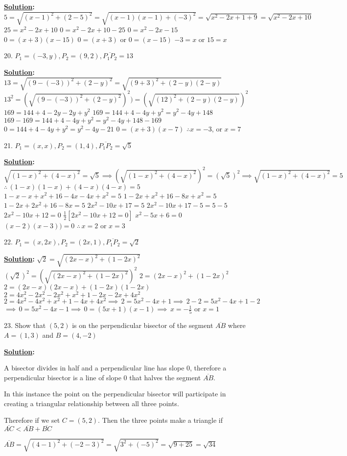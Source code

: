 \documentclass[10pt,letterpaper]{article}
\begin{document}
\textbf{\underline {Solution}:}
$5=\sqrt{(x-1)^2+(2-5)^2}=\sqrt{(x-1)(x-1)+(-3)^2}=\sqrt{x^2-2x+1+9}=\sqrt{x^2-2x+10}$
$25=x^2-2x+10$
$0=x^2-2x+10-25$
$0=x^2-2x-15$
$0=(x+3)(x-15)$
$0=(x+3)$ or $0=(x-15)$
$-3=x$ or $15=x$

20. $P_{1} = (-3, y), P_{2} = (9, 2), \overline{P_1P_2 }= 13$

\textbf{\underline {Solution}:}
$13=\sqrt{(9-(-3))^2+(2-y)^2} = \sqrt{(9+3)^2+(2-y)(2-y)}$
$13^2=(\sqrt{(9-(-3))^2+(2-y)^2})^2) = (\sqrt{(12)^2+(2-y)(2-y)})^2$
$169=144+4-2y-2y+y^2$
$169=144+4-4y+y^2=y^2-4y+148$
$169-169=144+4-4y+y^2=y^2-4y+148-169$
$0=144+4-4y+y^2=y^2-4y-21$
$0=(x+3)(x-7)$
$\therefore x=-3$, or $x=7$

21. $P_{1} = (x, x), P_{2} = (1, 4), \overline{P_1P_2} = \sqrt{5}$

\textbf{\underline {Solution}:}
$\sqrt{(1-x)^2+(4-x)^2}=\sqrt{5} \implies (\sqrt{(1-x)^2+(4-x)^2})^2=(\sqrt{5})^2 \implies \sqrt{(1-x)^2+(4-x)^2}=5$
$\therefore\,(1-x)(1-x)+(4-x)(4-x)=5$
$1-x-x+x^2+16-4x-4x+x^2=5$
$1-2x+x^2+16-8x+x^2=5$
$1-2x+2x^2+16-8x=5$
$2x^2-10x+17=5$
$2x^2-10x+17-5=5-5$
$2x^2-10x+12=0$
$\frac{1}{2}[2x^2-10x+12=0]$
$x^2-5x+6=0$
$(x-2)(x-3))=0$
$\therefore\,x=2$ or $x=3$

22. $P_{1} = (x, 2x), P_{2} = (2x, 1), \overline{P_1P_2} = \sqrt{2}$

\textbf{\underline {Solution}:}
$\sqrt{2}=\sqrt{(2x-x)^2+(1-2x)^2}$
$(\sqrt{2})^2=(\sqrt{(2x-x)^2+(1-2x)^2})^2$
$2=(2x-x)^2+(1-2x)^2$
$2=(2x-x)(2x-x)+(1-2x)(1-2x)$
$2=4x^2-2x^2-2x^2+x^2+1-2x-2x+4x^2$
$2=4x^2-4x^2+x^2+1-4x+4x^2 \implies\, 2=5x^2-4x+1 \implies\, 2-2=5x^2-4x+1-2$
$\implies\, 0=5x^2-4x-1 \implies\, 0=(5x+1)(x-1) \implies\, x=-\frac{1}{5}$ or $x=1$

23. Show that $(5,2)$ is on the perpendicular bisector of the segment $\overline{AB}$ where $A = (1,3)$ and $B=(4, -2)$

\textbf{\underline {Solution}:}

A bisector divides in half and a perpendicular line has slope 0, therefore a perpendicular bisector is a line of slope 0 that halves the segment $\overline{AB}$.

In this instance the point on the perpendicular bisector will participate in creating a triangular relationship between all three points.

Therefore if we set $C=(5,2)$. Then the three points make a triangle if $\overline{AC} <\overline{AB}+\overline{BC}$

$\overline{AB}=\sqrt{(4-1)^2+(-2-3)^2}=\sqrt{3^2+(-5)^2}=\sqrt{9+25}=\sqrt{34}$
\end{document}
